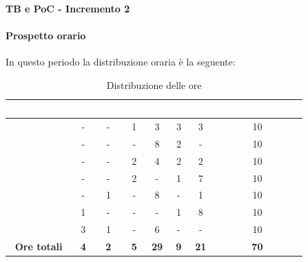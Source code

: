 \paragraph{TB e PoC - Incremento 2}
\paragraph*{Prospetto orario}
In questo periodo la distribuzione oraria è la seguente:
\begin{table}[H]
	\begin{center}
		\begin{tabular}{ |c c c c c c c c| }
			\rowcolor{darkblue} 
			\textcolor{white}{\textbf{Nominativo}} & \textcolor{white}{\textbf{Re}} & \textcolor{white}{\textbf{Am}} & \textcolor{white}{\textbf{An}} & \textcolor{white}{\textbf{Pt}} & \textcolor{white}{\textbf{Pr}} & \textcolor{white}{\textbf{Ve}} & \textcolor{white}{\textbf{Ore Complessive}} \\ \hline
		\BL 	& -  	& -  	& 1 	& 3 	& 3 	& 3	& 10 \\ \hline
		\FF 	& -  	& -  	& - 	& 8 	& 2 	& -  	& 10 \\ \hline
		\MM 	& -  	& -  	& 2 	& 4	& 2 	& 2  	& 10 \\ \hline
		\PC 	& - 	& -  	& 2 	& - 	& 1 	& 7 	& 10 \\ \hline
		\TG 	& -  	& 1 	& - 	& 8	& - 	& 1 	& 10 \\ \hline
		\TL 	& 1  	& - 	& - 	& - 	& 1 	& 8 	& 10 \\ \hline
		\VD 	& 3  	& 1  	& - 	& 6 	& - 	& -  	& 10 \\ \hline
		\textbf{Ore totali} & \textbf{4} & \textbf{2} & \textbf{5} & \textbf{29} & \textbf{9} & \textbf{21} & \textbf{70} \\ \hline
	\end{tabular}
		\caption{Distribuzione delle ore}
	\end{center}
\end{table}
